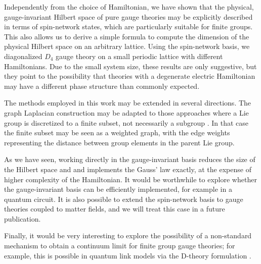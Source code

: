 Independently from the choice of Hamiltonian, we have shown that the physical, gauge-invariant Hilbert space of pure gauge theories may be explicitly described in terms of spin-network states, which are particularly suitable for finite groups.
This also allows us to derive a simple formula to compute the dimension of the physical Hilbert space on an arbitrary lattice.
Using the spin-network basis, we diagonalized $D_4$ gauge theory on a small periodic lattice with different Hamiltonians.
Due to the small system size, these results are only suggestive, but they point to the possibility that theories with a degenerate electric Hamiltonian may have a different phase structure than commonly expected.

The methods employed in this work may be extended in several directions. The graph Laplacian construction may be adapted to those approaches where a Lie group is discretized to a finite subset, not necessarily a subgroup \cite{hackett2019lgt}. In that case the finite subset may be seen as a weighted graph, with the edge weights representing the distance between group elements in the parent Lie group.

As we have seen, working directly in the gauge-invariant basis reduces the size of the Hilbert space and and implements the Gauss' law exactly, at the expense of higher complexity of the Hamiltonian. It would be worthwhile to explore whether the gauge-invariant basis can be efficiently implemented, for example in a quantum circuit. It is also possible to extend the spin-network basis to gauge theories coupled to matter fields, and we will treat this case in a future publication.

Finally, it would be very interesting to explore the possibility of a non-standard mechanism to obtain a continuum limit for finite group gauge theories; for example, this is possible in quantum link models via the D-theory formulation \cite{brower2004dtheory, wiese2006dtheory}.


